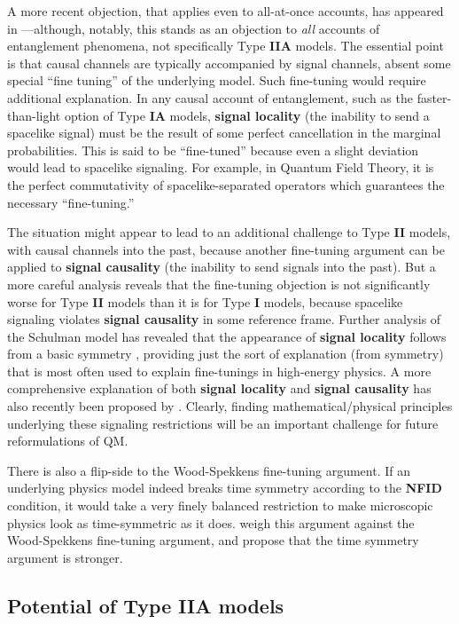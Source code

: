 \documentclass[rmp, aps, preprint, longbibliography]{revtex4-1}
\begin{document}
A more recent objection, that applies even to all-at-once accounts, has appeared in \textcite{wood2015}---although, notably, this stands as an objection to {\em all} accounts of entanglement phenomena, not specifically Type {\bf IIA} models.  The essential point is that causal channels are typically accompanied by signal channels, absent some special ``fine tuning'' of the underlying model.  Such fine-tuning would require additional explanation.  In any causal account of entanglement, such as the faster-than-light option of Type {\bf IA} models, {\bf signal locality} (the inability to send a spacelike signal) must be the result of some perfect cancellation in the marginal probabilities.  This is said to be ``fine-tuned'' because even a slight deviation would lead to spacelike signaling.  For example, in Quantum Field Theory, it is the perfect commutativity of spacelike-separated operators which guarantees the necessary ``fine-tuning.''

The situation might appear to lead to an additional challenge to Type {\bf II} models, with causal channels into the past, because another fine-tuning argument can be applied to {\bf signal causality} (the inability to send signals into the past).  But a more careful analysis reveals that the fine-tuning objection is not significantly worse for Type {\bf II} models than it is for Type {\bf I} models, because spacelike signaling violates {\bf signal causality} in some reference frame.  Further analysis of the Schulman model has revealed that the appearance of {\bf signal locality} follows from a basic symmetry \cite{almada2016}, providing just the sort of explanation (from symmetry) that is most often used to explain fine-tunings in high-energy physics.  A more comprehensive explanation of both {\bf signal locality} and {\bf signal causality} has also recently been proposed by \textcite{adlam2018a}.  Clearly, finding mathematical/physical principles underlying these signaling restrictions will be an important challenge for future reformulations of QM.

There is also a flip-side to the Wood-Spekkens fine-tuning argument.  If an underlying physics model indeed breaks time symmetry according to the {\bf NFID} condition, it would take a very finely balanced restriction to make microscopic physics look as time-symmetric as it does.  \textcite{leifer2017a} weigh this argument against the Wood-Spekkens fine-tuning argument, and propose that the time symmetry argument is stronger.

\subsection{Potential of Type {\bf IIA} models}
\label{sec:discussionII}
\end{document}
